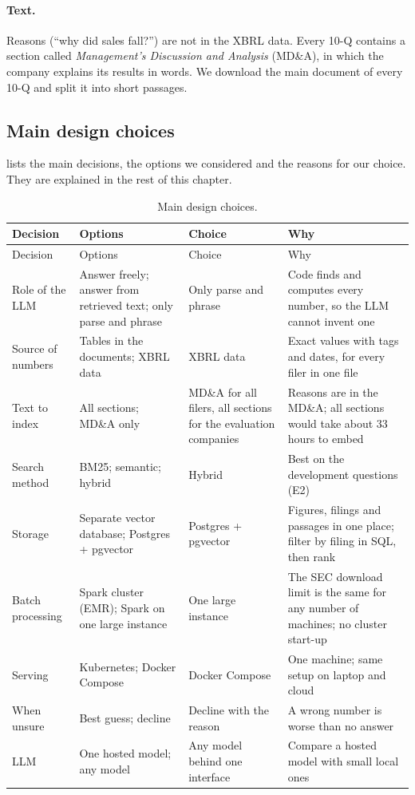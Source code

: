 \paragraph{Text.} Reasons (``why did sales fall?'') are not in the XBRL data. Every 10-Q contains a
section called \emph{Management's Discussion and Analysis} (MD\&A), in which the company explains its
results in words. We download the main document of every 10-Q and split it into short passages.

\subsection{Main design choices}

 lists the main decisions, the options we considered and the reasons for our
choice. They are explained in the rest of this chapter.

{\small
\begin{xltabular}{\linewidth}{>{\raggedright\arraybackslash}p{27mm}>{\raggedright\arraybackslash}p{30mm}>{\raggedright\arraybackslash}p{30mm}X}
\caption{Main design choices.}\label{tab:choices}\\
\toprule
Decision & Options & Choice & Why \\
\midrule
\endfirsthead
\toprule
Decision & Options & Choice & Why \\
\midrule
\endhead
Role of the LLM & Answer freely; answer from retrieved text; only parse and phrase &
  Only parse and phrase & Code finds and computes every number, so the LLM cannot invent one \\
Source of numbers & Tables in the documents; XBRL data & XBRL data &
  Exact values with tags and dates, for every filer in one file \\
Text to index & All sections; MD\&A only & MD\&A for all filers, all sections for the evaluation companies &
  Reasons are in the MD\&A; all sections would take about 33 hours to embed \\
Search method & BM25; semantic; hybrid & Hybrid & Best on the development questions (E2) \\
Storage & Separate vector database; Postgres + pgvector & Postgres + pgvector &
  Figures, filings and passages in one place; filter by filing in SQL, then rank \\
Batch processing & Spark cluster (EMR); Spark on one large instance & One large instance &
  The SEC download limit is the same for any number of machines; no cluster start-up \\
Serving & Kubernetes; Docker Compose & Docker Compose & One machine; same setup on laptop and cloud \\
When unsure & Best guess; decline & Decline with the reason & A wrong number is worse than no answer \\
LLM & One hosted model; any model & Any model behind one interface &
  Compare a hosted model with small local ones \\
\bottomrule
\end{xltabular}}

